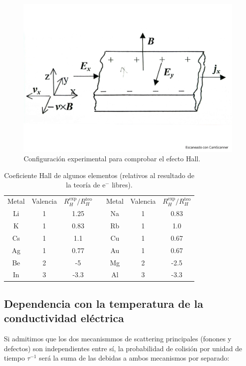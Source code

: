 \begin{figure}[h!] \centering
	\includegraphics[scale=0.35]{Cuerpo/Ch_06/Fotos libro 7.pdf}
	\caption{Configuración experimental para comprobar el efecto Hall.}
	\label{Fig:06-07}
\end{figure}  

\begin{table}[h!] \centering
	\begin{tabular}{ccc c ccc}
		Metal & Valencia & $R_H^{\text{exp}}/R_H^{\text{teo}}$ & & Metal & Valencia & $R_H^{\text{exp}}/R_H^{\text{teo}}$ \\ \cline{1-3} \cline{5-7} 
		Li & 1 & 1.25 & & Na & 1 & 0.83 \\
		K & 1 & 0.83 & & Rb & 1 & 1.0 \\
		Cs & 1 & 1.1 & & Cu & 1 & 0.67 \\
		Ag & 1 & 0.77 & & Au & 1 & 0.67 \\
		Be & 2 & -5 & & Mg & 2 & -2.5 \\
		In & 3 & -3.3 & & Al & 3 & -3.3 
	\end{tabular}
	\caption{Coeficiente Hall de algunos elementos (relativos al resultado de la teoría de e$^-$ libres).}
	\label{Tab:06-03}
\end{table}

\subsection{Dependencia con la temperatura de la conductividad eléctrica}

Si admitimos que los dos mecanismmos de scattering principales (fonones y defectos) son independientes entre sí, la probabilidad de colisión por unidad de tiempo $\tau^{-1}$ será la suma de las debidas a ambos mecanismos por separado:

